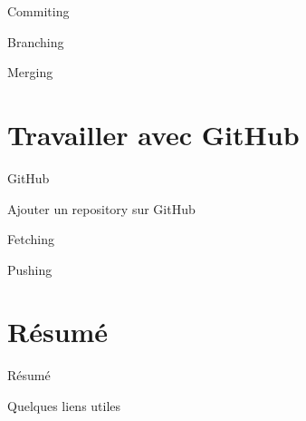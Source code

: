 \documentclass{beamer}
\begin{document}
\begin{frame}{Commiting}
	
\end{frame}

\begin{frame}{Branching}
	
\end{frame}

\begin{frame}{Merging}
	
\end{frame}

\section{Travailler avec GitHub}
\begin{frame}{GitHub}
	
\end{frame}

\begin{frame}{Ajouter un repository sur GitHub}

\end{frame}

\begin{frame}{Fetching}
	
\end{frame}

\begin{frame}{Pushing}
	
\end{frame}


\section{Résumé}
\begin{frame}{Résumé}

\end{frame}

\begin{frame}{Quelques liens utiles}
	
\end{frame}
\end{document}

